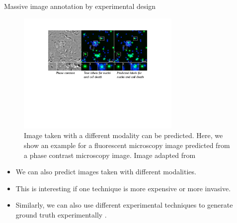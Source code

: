 \documentclass[xcolor=pdftex,dvipsnames,table]{beamer}
\begin{document}
\begin{frame}{Massive image annotation by experimental design}
\begin{figure}[htb]
   \centering
   \includegraphics[width=0.7\textwidth]{../graphics/in_silico_labeling.pdf}
   \caption{Image taken with a different modality can be predicted. Here, we show an example for a fluorescent microscopy image predicted from a phase contrast microscopy image. Image adapted from \cite{Christiansen2018}}
\end{figure}
\begin{itemize}
   \item We can also predict images taken with different modalities. 
   \item This is interesting if one technique is more expensive or more invasive.
   \item Similarly, we can also use different experimental techniques to generate ground truth experimentally \cite{Boyd2020}. 
\end{itemize}
\end{frame}
\end{document}
